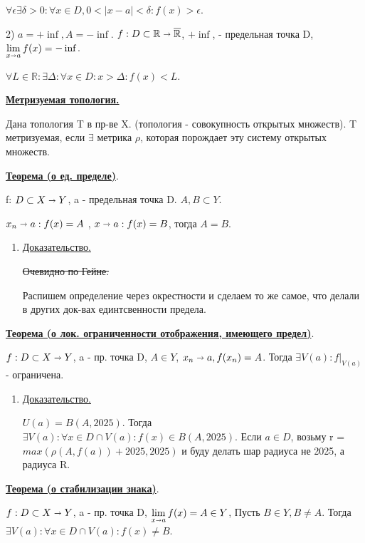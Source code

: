 \documentclass{article}
\newcommand{\deff}[1]{\underline{\textbf{#1}}}
\newcommand{\thmm}[1]{\underline{\textbf{#1}}}
\begin{document}
$\forall \epsilon \exists\delta>0: \forall x \in D, 0<|x-a|<\delta: f(x)>\epsilon$.

2) $ a = +\inf, A= - \inf$. $f: D\subset \mathbb{R} \shortrightarrow \overline{\mathbb{R}}$, $+\inf$,  - предельная точка D, $\lim\limits_{x\shortrightarrow a} f(x) = -\inf$. 

$\forall L \in \mathbb{R}: \exists \Delta: \forall x \in D: x>\Delta: f(x)<L$.

\deff{Метризуемая топология.}

Дана топология T в пр-ве X. (топология - совокупность открытых множеств). T метризуемая, если  $\exists$ метрика $\rho$, которая порождает эту систему открытых множеств.

\thmm{Теорема (о ед. пределе)}.

f: $D \subset X \shortrightarrow Y$, a - предельная точка D. $A,B \subset Y$.

$ {x_n\shortrightarrow a}: f(x) = A$ , ${x\shortrightarrow a}: f(x) = B$, тогда $A=B$. 

\begin{enumerate}
        \item[] \uline{Доказательство.}

        \sout{Очевидно по Гейне.}
                
         Распишем определение через окрестности и сделаем то же самое, что делали в других док-вах единтсвенности предела.
\end{enumerate}

\thmm{Теорема (о лок. ограниченности отображения, имеющего предел)}.

$f: D \subset X \shortrightarrow Y$, a - пр. точка D, $A \in Y$, ${x_n\shortrightarrow a},f(x_n) = A$. Тогда $\exists V(a): f|_{V(a)}$ - ограничена.

\begin{enumerate}
        \item[] \uline{Доказательство.}

        $U(a) = B(A,2025)$. Тогда $\exists V(a): \forall x \in D \cap V(a): f(x) \in B(A,2025)$. Если $a\in D$, возьму r = $max(\rho(A,f(a))+2025,2025)$ и буду делать шар радиуса не 2025, а радиуса R.
\end{enumerate}

\thmm{Теорема (о стабилизации знака)}.

$f: D \subset X \shortrightarrow Y$, a - пр. точка D, $\lim\limits_{x\shortrightarrow a} f(x) = A \in Y$, Пусть $B \in Y, B \neq A$. Тогда $\exists V(a): \forall x \in D \cap V(a): f(x) \neq B$.
\end{document}
